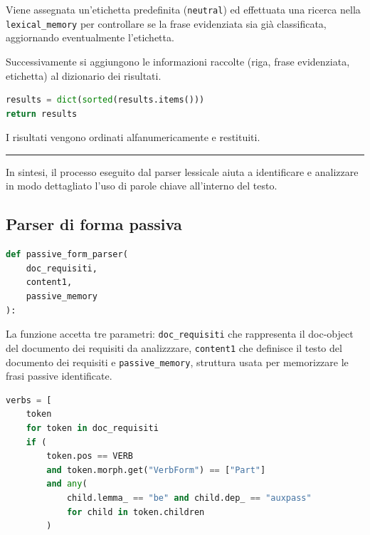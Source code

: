 \documentclass[12pt]{report}
\begin{document}
\noindent Viene assegnata un'etichetta predefinita (\texttt{neutral}) ed effettuata una ricerca nella \texttt{lexical\_memory} per controllare se la frase evidenziata sia già classificata, aggiornando eventualmente l'etichetta.

Successivamente si aggiungono le informazioni raccolte (riga, frase evidenziata, etichetta) al dizionario dei risultati.


\begin{mdframed}
\small
\begin{lstlisting}[language=Python]
results = dict(sorted(results.items()))
return results
\end{lstlisting}
\end{mdframed}

\noindent I risultati vengono ordinati alfanumericamente e restituiti.

{\centering \rule{0.5\linewidth}{0.1pt} \par\vspace{0.25cm}}

In sintesi, il processo eseguito dal \textsf{parser lessicale} aiuta a identificare e analizzare in modo dettagliato l’uso di parole chiave all’interno del testo.


\subsection{Parser di forma passiva}
\label{subsec:parser_forma_passiva}

\begin{mdframed}
\small
\begin{lstlisting}[language=Python]
def passive_form_parser(
    doc_requisiti,
    content1,
    passive_memory
):
\end{lstlisting}
\end{mdframed}

\noindent La funzione accetta tre parametri: \texttt{doc\_requisiti} che rappresenta il doc-object del documento dei requisiti da analizzzare, \texttt{content1} che definisce il testo del documento dei requisiti e \texttt{passive\_memory}, struttura usata per memorizzare le frasi passive identificate.


\begin{mdframed}
\small
\begin{lstlisting}[language=Python]
verbs = [
    token
    for token in doc_requisiti
    if (
        token.pos == VERB
        and token.morph.get("VerbForm") == ["Part"]
        and any(
            child.lemma_ == "be" and child.dep_ == "auxpass"
            for child in token.children
        )
\end{lstlisting}
\end{mdframed}
\end{document}
